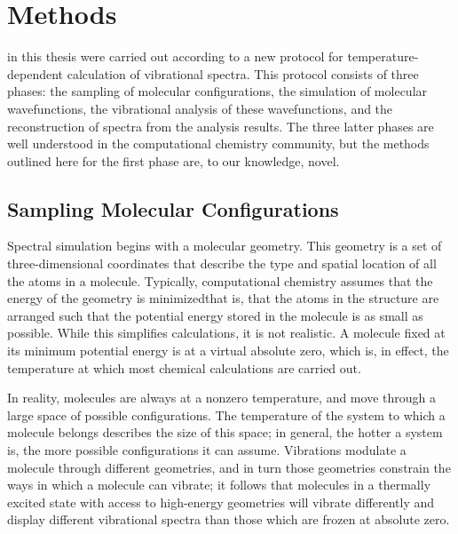 
\chapter{Methods}

 in this thesis were carried out according to a new protocol for temperature-dependent calculation of vibrational spectra. This protocol consists of three phases: the sampling of molecular configurations, the simulation of molecular wavefunctions, the vibrational analysis of these wavefunctions, and the reconstruction of spectra from the analysis results. The three latter phases are well understood in the computational chemistry community\cite{RefWorks:33, RefWorks:34, RefWorks:37, RefWorks:38, RefWorks:39, RefWorks:40}, but the methods outlined here for the first phase are, to our knowledge, novel.

\section{Sampling Molecular Configurations}

Spectral simulation begins with a molecular geometry. This geometry is a set of three-dimensional coordinates that describe the type and spatial location of all the atoms in a molecule. Typically, computational chemistry assumes that the energy of the geometry is minimized\textemdash that is, that the atoms in the structure are arranged such that the potential energy stored in the molecule is as small as possible. While this simplifies calculations, it is not realistic. A molecule fixed at its minimum potential energy is at a virtual absolute zero, which is, in effect, the temperature at which most chemical calculations are carried out.

In reality, molecules are always at a nonzero temperature, and move through a large space of possible configurations. The temperature of the system to which a molecule belongs describes the size of this space; in general, the hotter a system is, the more possible configurations it can assume. Vibrations modulate a molecule through different geometries, and in turn those geometries constrain the ways in which a molecule can vibrate; it follows that molecules in a thermally excited state with access to high-energy geometries will vibrate differently and display different vibrational spectra than those which are frozen at absolute zero.

